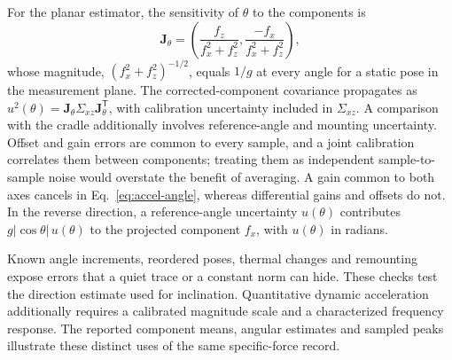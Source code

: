 For the planar estimator, the sensitivity of $\theta$ to the components is
\begin{equation}
 \bm J_\theta=
 \left(\frac{f_z}{f_x^2+f_z^2},
       \frac{-f_x}{f_x^2+f_z^2}\right),
 \label{eq:accel-angle-gradient}
\end{equation}
whose magnitude, $(f_x^2+f_z^2)^{-1/2}$, equals $1/g$ at every angle for a static pose in the measurement plane. The corrected-component covariance propagates as $u^2(\theta)=\bm J_\theta\Sigma_{xz}\bm J_\theta^\mathsf T$, with calibration uncertainty included in $\Sigma_{xz}$. A comparison with the cradle additionally involves reference-angle and mounting uncertainty. Offset and gain errors are common to every sample, and a joint calibration correlates them between components; treating them as independent sample-to-sample noise would overstate the benefit of averaging. A gain common to both axes cancels in Eq.~\ref{eq:accel-angle}, whereas differential gains and offsets do not. In the reverse direction, a reference-angle uncertainty $u(\theta)$ contributes $g|\cos\theta|\,u(\theta)$ to the projected component $f_x$, with $u(\theta)$ in radians.

Known angle increments, reordered poses, thermal changes and remounting expose errors that a quiet trace or a constant norm can hide. These checks test the direction estimate used for inclination. Quantitative dynamic acceleration additionally requires a calibrated magnitude scale and a characterized frequency response. The reported component means, angular estimates and sampled peaks illustrate these distinct uses of the same specific-force record.
